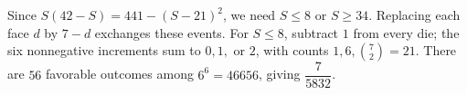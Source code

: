 Since $S(42-S)=441-(S-21)^2$, we need $S\le8$ or $S\ge34$. Replacing each face $d$ by $7-d$ exchanges these events. For $S\le8$, subtract $1$ from every die; the six nonnegative increments sum to $0,1,$ or $2$, with counts $1,6,\binom72=21$. There are $56$ favorable outcomes among $6^6=46656$, giving $\boxed{\dfrac{7}{5832}}$.
